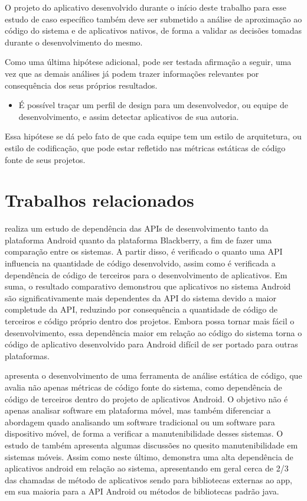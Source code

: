 O projeto do aplicativo desenvolvido durante o início deste trabalho para esse estudo de caso específico também deve ser submetido a análise de aproximação ao código do sistema e de aplicativos nativos, de forma a validar as decisões tomadas durante o desenvolvimento do mesmo.

Como uma última hipótese adicional, pode ser testada afirmação a seguir, uma vez que as demais análises já podem trazer informações relevantes por consequência dos seus próprios resultados.

\begin{itemize}
\item É possível traçar um perfil de design para um desenvolvedor, ou equipe de desenvolvimento, e assim detectar aplicativos de sua autoria.
\end{itemize}

Essa hipótese se dá pelo fato de que cada equipe tem um estilo de arquitetura, ou estilo de codificação, que pode estar refletido nas métricas estáticas de código fonte de seus projetos.

\section{Trabalhos relacionados}

  realiza um estudo de dependência das APIs de desenvolvimento tanto da plataforma Android quanto da plataforma Blackberry, a fim de fazer uma comparação entre os sistemas. A partir disso, é verificado o quanto uma API influencia na quantidade de código desenvolvido, assim como é verificada a dependência de código de terceiros para o desenvolvimento de aplicativos. Em suma, o resultado comparativo demonstrou que aplicativos no sistema Android são significativamente mais dependentes da API do sistema devido a maior completude da API, reduzindo por consequência a quantidade de código de terceiros e código próprio dentro dos projetos. Embora possa tornar mais fácil o desenvolvimento, essa dependência maior em relação ao código do sistema torna o código de aplicativo desenvolvido para Android difícil de ser portado para outras plataformas.

 apresenta o desenvolvimento de uma ferramenta de análise estática de código, que avalia não apenas métricas de código fonte do sistema, como dependência de código de terceiros dentro do projeto de aplicativos Android. O objetivo não é apenas analisar software em plataforma móvel, mas também diferenciar a abordagem quado analisando um software tradicional ou um software para dispositivo móvel, de forma a verificar a manutenibilidade desses sistemas. O estudo de  também apresenta algumas discussões no quesito manutenibilidade em sistemas móveis. Assim como neste último,  demonstra uma alta dependência de aplicativos android em relação ao sistema, apresentando em geral cerca de  2/3 das chamadas de método de aplicativos sendo para bibliotecas externas ao app, em sua maioria para a API Android ou métodos de bibliotecas padrão java.

